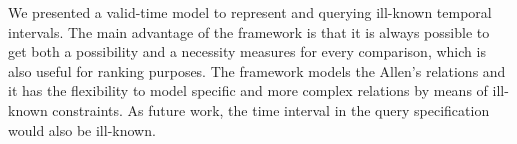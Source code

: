We presented a valid-time model to represent and querying ill-known temporal intervals. The main advantage of the framework is that it is always possible to get both a possibility and a necessity measures for every comparison, which is also useful for ranking purposes. The framework models the Allen's relations and it has the flexibility to model specific and more complex relations by means of ill-known constraints.  As future work, the time interval in the query specification would also be ill-known.